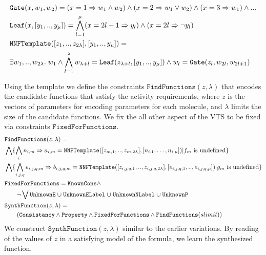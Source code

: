 
\begin{align*}
  &\texttt{Gate}( x, w_1, w_2 ) = ( x  = 1 \Rightarrow w_1  \land w_2 ) \land  
  ( x = 2  \Rightarrow w_1  \lor w_2 ) \land
  ( x = 3  \Rightarrow w_1 ) \land ...\\
  &\texttt{Leaf}( x, [y_1,..,y_\mu] ) =
  \bigwedge\limits_{l=1}^{\mu} ( x = 2l-1  \Rightarrow y_{l}) \land ( x = 2l  \Rightarrow \lnot y_{l})\\
  &\texttt{NNFTemplate}([z_1,..,z_{2\lambda}],[y_1,..,y_\mu] ) = \\
  &\exists w_1,..,w_{2\lambda}.\;w_1 \land \bigwedge_{l=1}^{\lambda} w_{\lambda+l} = \texttt{Leaf}( z_{\lambda+l}, [y_1,..,y_\mu] ) \land
  w_{l} = \texttt{Gate}( z_l, w_{2l},w_{2l+1})
\end{align*}

Using the template we define the constraints $\texttt{FindFunctions}(z,\lambda)$
that encodes the candidate functions that satisfy the activity requirements,
where $z$ is the vectors of parameters for encoding parameters
for each molecule,
and $\lambda$ limits the size of the candidate functions. 
%
We fix the all other aspect of the VTS to be fixed via constraints
$\texttt{FixedForFunctions}$.
%
\begin{align*}
  &\texttt{FindFunctions}(z,\lambda) =\\
  &\bigwedge \{ \bigwedge\limits_{i} n_{i,m} \Rightarrow a_{i,m} = 
  \texttt{NNFTemplate}([z_{m,1},..,z_{m,2\lambda}],[n_{i,1},\dots,n_{i,\mu}] ) |
  f_m \text{ is undefined}\} \\
  &\bigwedge \{ \bigwedge\limits_{i,j,q} e_{i,j,q,m} \Rightarrow b_{i,j,q,m} = 
  \texttt{NNFTemplate}([z_{i,j,q,1},..,z_{i,j,q,2\lambda}],[e_{i,j,q,1},..,e_{i,j,q,\mu}] ) | 
  g_m \text{ is undefined}
  \}\\
  & \texttt{FixedForFunctions} = \texttt{KnownCons} \land\\
  & \quad \quad
\lnot \bigvee \texttt{UnknownE} \;{\cup}\; \texttt{UnknownELabel} \;{\cup}\;
                    \texttt{UnknownNLabel} \;{\cup}\;
                    \texttt{UnknownP}\\
  &\texttt{SynthFunction}(z,\lambda) = \\
  & \quad\quad
    (  \texttt{Consistancy}\land \texttt{Property} \land
   \texttt{FixedForFunctions} \land \texttt{FindFunctions}(slimit) )
\end{align*}
We construct $\texttt{SynthFunction}(z,\lambda)$ similar to the earlier
variations.
%
By reading of the values of $z$ in a satisfying model of the formula,
we learn the synthesized function.

